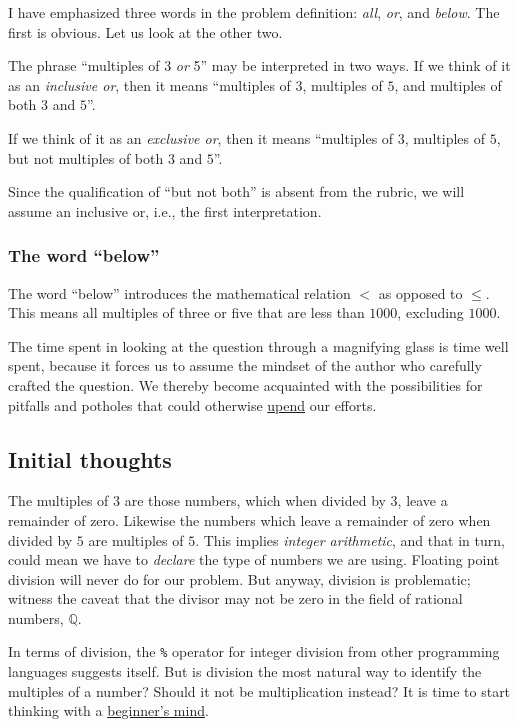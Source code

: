 \documentclass[
  a4paper,
]{article}
\begin{document}
I have emphasized three words in the problem definition: \emph{all},
\emph{or}, and \emph{below}. The first is obvious. Let us look at the
other two.

The phrase ``multiples of 3 \emph{or} 5'' may be interpreted in two
ways. If we think of it as an \emph{inclusive or}, then it means
``multiples of \(3\), multiples of \(5\), and multiples of both \(3\)
and \(5\)''.

If we think of it as an \emph{exclusive or}, then it means ``multiples
of \(3\), multiples of \(5\), but not multiples of both \(3\) and
\(5\)''.

Since the qualification of ``but not both'' is absent from the rubric,
we will assume an inclusive or, i.e., the first interpretation.

\hypertarget{the-word-below}{%
\subsubsection{The word ``below''}\label{the-word-below}}

The word ``below'' introduces the mathematical relation \(<\) as opposed
to \(\leq\). This means all multiples of three or five that are less
than \(1000\), excluding \(1000\).

The time spent in looking at the question through a magnifying glass is
time well spent, because it forces us to assume the mindset of the
author who carefully crafted the question. We thereby become acquainted
with the possibilities for pitfalls and potholes that could otherwise
\href{https://www.powerthesaurus.org/upend/synonyms}{upend} our efforts.

\hypertarget{initial-thoughts}{%
\subsection{Initial thoughts}\label{initial-thoughts}}

The multiples of \(3\) are those numbers, which when divided by \(3\),
leave a remainder of zero. Likewise the numbers which leave a remainder
of zero when divided by \(5\) are multiples of \(5\). This implies
\emph{integer arithmetic}, and that in turn, could mean we have to
\emph{declare} the type of numbers we are using. Floating point division
will never do for our problem. But anyway, division is problematic;
witness the caveat that the divisor may not be zero in the field of
rational numbers, \(\mathbb{Q}\).

In terms of division, the \texttt{\%} operator for integer division from
other programming languages suggests itself. But is division the most
natural way to identify the multiples of a number? Should it not be
multiplication instead? It is time to start thinking with a
\href{https://en.wikipedia.org/wiki/Shoshin}{beginner's mind}.
\end{document}
